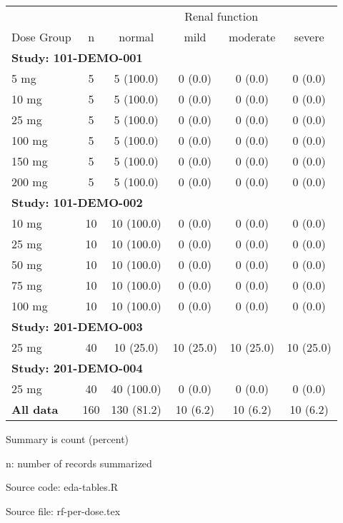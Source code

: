 \setlength{\tabcolsep}{5pt} 
\begin{threeparttable}
\renewcommand{\arraystretch}{1.3}
\begin{tabular}[h]{lccccc}
\hline
\multicolumn{2}{c}{} & \multicolumn{4}{c}{Renal function} \\
\cmidrule(lr){3-6}
Dose Group & n & normal & mild & moderate & severe \\
\hline
\multicolumn{6}{l}{\textbf{Study: 101-DEMO-001}}\\%
5 mg & 5 & 5 (100.0) & 0 (0.0) & 0 (0.0) & 0 (0.0) \\
10 mg & 5 & 5 (100.0) & 0 (0.0) & 0 (0.0) & 0 (0.0) \\
25 mg & 5 & 5 (100.0) & 0 (0.0) & 0 (0.0) & 0 (0.0) \\
100 mg & 5 & 5 (100.0) & 0 (0.0) & 0 (0.0) & 0 (0.0) \\
150 mg & 5 & 5 (100.0) & 0 (0.0) & 0 (0.0) & 0 (0.0) \\
200 mg & 5 & 5 (100.0) & 0 (0.0) & 0 (0.0) & 0 (0.0) \\
\hline \multicolumn{6}{l}{\textbf{Study: 101-DEMO-002}}\\%
10 mg & 10 & 10 (100.0) & 0 (0.0) & 0 (0.0) & 0 (0.0) \\
25 mg & 10 & 10 (100.0) & 0 (0.0) & 0 (0.0) & 0 (0.0) \\
50 mg & 10 & 10 (100.0) & 0 (0.0) & 0 (0.0) & 0 (0.0) \\
75 mg & 10 & 10 (100.0) & 0 (0.0) & 0 (0.0) & 0 (0.0) \\
100 mg & 10 & 10 (100.0) & 0 (0.0) & 0 (0.0) & 0 (0.0) \\
\hline \multicolumn{6}{l}{\textbf{Study: 201-DEMO-003}}\\%
25 mg & 40 & 10 (25.0) & 10 (25.0) & 10 (25.0) & 10 (25.0) \\
\hline \multicolumn{6}{l}{\textbf{Study: 201-DEMO-004}}\\%
25 mg & 40 & 40 (100.0) & 0 (0.0) & 0 (0.0) & 0 (0.0) \\
\hline \hline {\bf All data} & 160 & 130 (81.2) & 10 (6.2) & 10 (6.2) & 10 (6.2) \\
\hline
\end{tabular}
\begin{tablenotes}[flushleft]
\item Summary is count (percent)
\item n: number of records summarized
\item Source code: eda-tables.R
\item Source file: rf-per-dose.tex
\end{tablenotes}
\end{threeparttable}

